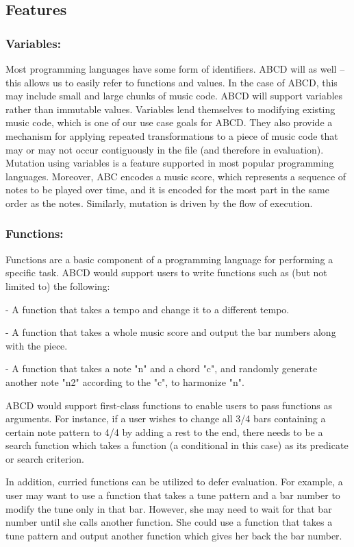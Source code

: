 \subsection{Features}
    \subsubsection{Variables:}
    Most programming languages have some form of identifiers. ABCD will as well -- this allows us to easily refer to functions and values. In the case of ABCD, this may include small and large chunks of music code. ABCD will support variables rather than immutable values. Variables lend themselves to modifying existing music code, which is one of our use case goals for ABCD. They also provide a mechanism for applying repeated transformations to a piece of music code that may or may not occur contiguously in the file (and therefore in evaluation). Mutation using variables is a feature supported in most popular programming languages. Moreover, ABC encodes a music score, which represents a sequence of notes to be played over time, and it is encoded for the most part in the same order as the notes. Similarly, mutation is driven by the flow of execution. 
    
    \subsubsection{Functions:}
    Functions are a basic component of a programming language for performing a specific task. ABCD would support users to write functions such as (but not limited to) the following:

    - A function that takes a tempo and change it to a different tempo.

    - A function that takes a whole music score and output the bar numbers along with the piece.
    
    - A function that takes a note "n" and a chord "c", and randomly generate another note "n2" according to the "c", to harmonize "n".
      
    ABCD would support first-class functions to enable users to pass functions as arguments. For instance, if a user wishes to change all 3/4 bars containing a certain note pattern to 4/4 by adding a rest to the end, there needs to be a search function which takes a function (a conditional in this case) as its predicate or search criterion.

     In addition, curried functions can be utilized to defer evaluation. For example, a user may want to use a function that takes a tune pattern and a bar number to modify the tune only in that bar. However, she may need to wait for that bar number until she calls another function. She could use a function that takes a tune pattern and output another function which gives her back the bar number.  

